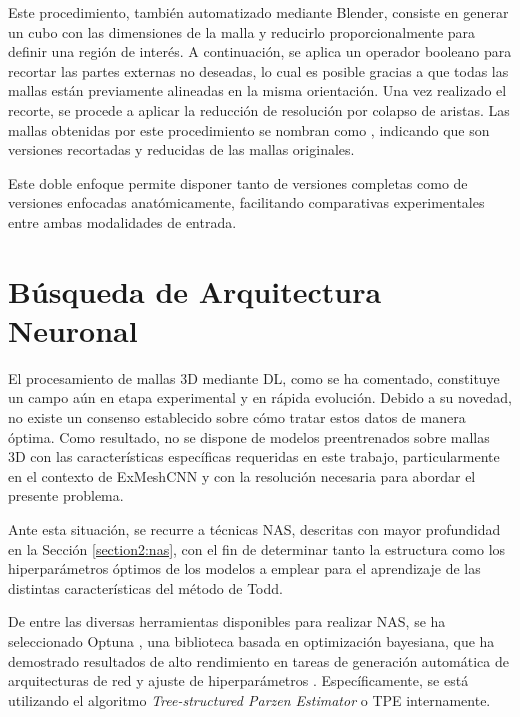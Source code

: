 Este procedimiento, también automatizado mediante Blender, consiste en generar un cubo con las dimensiones de la malla y reducirlo proporcionalmente para definir una región de interés. A continuación, se aplica un operador booleano para recortar las partes externas no deseadas, lo cual es posible gracias a que todas las mallas están previamente alineadas en la misma orientación. Una vez realizado el recorte, se procede a aplicar la reducción de resolución por colapso de aristas. Las mallas obtenidas por este procedimiento se nombran como , indicando que son versiones recortadas y reducidas de las mallas originales.

Este doble enfoque permite disponer tanto de versiones completas como de versiones enfocadas anatómicamente, facilitando comparativas experimentales entre ambas modalidades de entrada.

\section{Búsqueda de Arquitectura Neuronal}
\label{section4:nas}
El procesamiento de mallas 3D mediante DL, como se ha comentado, constituye un campo aún en etapa experimental y en rápida evolución. Debido a su novedad, no existe un consenso establecido sobre cómo tratar estos datos de manera óptima. Como resultado, no se dispone de modelos preentrenados sobre mallas 3D con las características específicas requeridas en este trabajo, particularmente en el contexto de ExMeshCNN y con la resolución necesaria para abordar el presente problema.

Ante esta situación, se recurre a técnicas NAS, descritas con mayor profundidad en la Sección \ref{section2:nas}, con el fin de determinar tanto la estructura como los hiperparámetros óptimos de los modelos a emplear para el aprendizaje de las distintas características del método de Todd.

De entre las diversas herramientas disponibles para realizar NAS, se ha seleccionado Optuna \cite{optuna_2019}, una biblioteca basada en optimización bayesiana, que ha demostrado resultados de alto rendimiento en tareas de generación automática de arquitecturas de red y ajuste de hiperparámetros \cite{pizurica_generic_2024}. Específicamente, se está utilizando el algoritmo \textit{Tree-structured Parzen Estimator} o TPE internamente.

